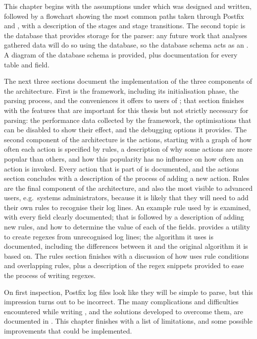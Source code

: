 This chapter begins with the assumptions under which \parsername{} was
designed and written, followed by a flowchart showing the most common paths
taken through Postfix and \parsername{}, with a description of the stages
and stage transitions.  The second topic is the  database that
provides storage for the parser: any future work that analyses gathered
data will do so using the database, so the database schema acts as an
.  A diagram of the database schema is provided, plus
documentation for every table and field.

The next three sections document the implementation of the three components
of the architecture.  First is the framework, including its initialisation
phase, the parsing process, and the conveniences it offers to users of
\parsername{}; that section finishes with the features that are important
for this thesis but not strictly necessary for parsing: the performance
data collected by the framework, the optimisations that can be disabled to
show their effect, and the debugging options it provides.  The second
component of the architecture is the actions, starting with a graph of how
often each action is specified by rules, a description of why some actions
are more popular than others, and how this popularity has no influence on
how often an action is invoked.  Every action that is part of \parsername{}
is documented, and the actions section concludes with a description of the
process of adding a new action.  Rules are the final component of the
architecture, and also the most visible to advanced users, e.g.\ systems
administrators, because it is likely that they will need to add their own
rules to recognise their log lines.  An example rule used by \parsername{}
is examined, with every field clearly documented; that is followed by a
description of adding new rules, and how to determine the value of each of
the fields.  \parsername{} provides a utility to create regexes from
unrecognised log lines; the algorithm it uses is documented, including the
differences between it and the original algorithm it is based on.  The
rules section finishes with a discussion of how \parsername{} uses rule
conditions and overlapping rules, plus a description of the regex snippets
provided to ease the process of writing regexes.

On first inspection, Postfix log files look like they will be simple to
parse, but this impression turns out to be incorrect.  The many
complications and difficulties encountered while writing \parsername{}, and
the solutions developed to overcome them, are documented in
.  This chapter finishes with a list of
\parsernames{} limitations, and some possible improvements that could be
implemented.

